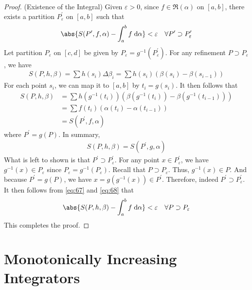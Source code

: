 \documentclass[thmcnt=section, 12pt]{elegantbook}
\begin{document}
\begin{proof}
    \par (Existence of the Integral) Given $\varepsilon > 0$, since $f \in \mathfrak{R}(\alpha)$ on $[a, b]$, there exists a partition $P^\prime_\varepsilon$ on $[a, b]$ such that 
    \begin{align}
        \abs{S(P^\prime, f, \alpha) - \int_a^b f \; \mathrm{d}\alpha} < \varepsilon
        \quad \forall P^\prime \supset P^\prime_\varepsilon
        \label{eq:67}
    \end{align}
    Let partition $P_\varepsilon$ on $[c, d]$ be given by $P_\varepsilon = g^{-1}(P^\prime_\varepsilon)$. For any refinement $P \supset P_\varepsilon$, we have 
    \begin{align*}
        S(P, h, \beta)
        = \sum h(s_i) \Delta\beta_i
        = \sum h(s_i) (\beta(s_i) - \beta(s_{i-1}))
    \end{align*}
    For each point $s_i$, we can map it to $[a, b]$ by $t_i = g(s_i)$. It then follows that 
    \begin{align*}
        S(P, h, \beta)
        &= \sum h(g^{-1}(t_i)) (\beta(g^{-1}(t_i)) - \beta(g^{-1}(t_{i-1}))) \\ 
        &= \sum f(t_i) (\alpha(t_i) - \alpha(t_{i-1})) \\ 
        &= S(P^\prime, f, \alpha)
    \end{align*}
    where $P^\prime = g(P)$. In summary,
    \begin{align}
        S(P, h, \beta) = S(P^\prime, g, \alpha)
        \label{eq:68}
    \end{align}
    What is left to shown is that $P^\prime \supset P^\prime_\varepsilon$. For any point $x \in P^\prime_\varepsilon$, we have $g^{-1}(x) \in P_\varepsilon$ since $P_\varepsilon = g^{-1}(P_\varepsilon)$. Recall that $P \supset P_\varepsilon$. Thus, $g^{-1}(x) \in P$. And because $P^\prime = g(P)$, we have $x = g(g^{-1}(x)) \in P^\prime$. Therefore, indeed $P^\prime \supset P^\prime_\varepsilon$. It then follows from \eqref{eq:67} and \eqref{eq:68} that 
    \begin{align*}
        \abs{S(P, h, \beta) - \int_a^b f \; \mathrm{d}\alpha} < \varepsilon
        \quad \forall P \supset P_\varepsilon
    \end{align*}
    This completes the proof.
\end{proof}


\section{Monotonically Increasing Integrators}
\end{document}
